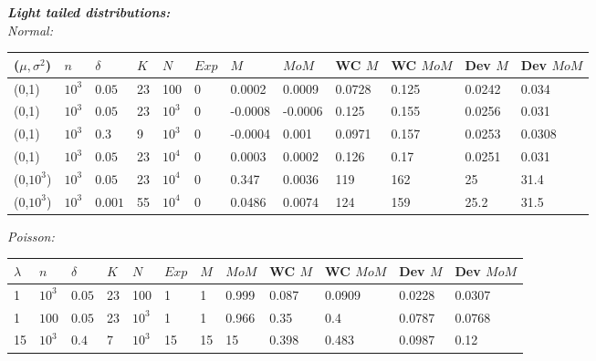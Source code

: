 \documentclass[11pt, english]{article}
\begin{document}
\textbf{\textit{Light tailed distributions:}}\\

\textit{Normal:}

\begin{center}
	
	\begin{tabular}{|l|l|l|l|l|l||l|l|l|l|l|l|}
		\hline
		($\mu,\sigma^2$) & $n$ & $\delta$ & $K$ & $N$ & $Exp$ & $M$ & $MoM$ & WC $M$ & WC $MoM$ & Dev $M$ & Dev $MoM$ \\
		\hline\hline
		(0,1) & $10^3$ &  $0.05$ & 23 & 100 & 0 & 0.0002 & 0.0009 & 0.0728 & 0.125 & 0.0242 & 0.034\\
		\hline
		(0,1) & $10^3$ &  $0.05$ & 23 & $10^3$ & 0 & -0.0008 & -0.0006 & 0.125 & 0.155 & 0.0256 & 0.031\\
		\hline
		(0,1) & $10^3$ &  $0.3$ & 9 & $10^3$ & 0 & -0.0004 & 0.001 & 0.0971 & 0.157 & 0.0253 & 0.0308\\
		\hline
		(0,1) & $10^3$ &  $0.05$ & 23 & $10^4$ & 0 & 0.0003 & 0.0002 & 0.126 & 0.17 & 0.0251 & 0.031\\
		\hline
		(0,$10^3$) & $10^3$ &  $0.05$ & 23 & $10^4$ & 0 & 0.347 & 0.0036 & 119 & 162
		& 25 & 31.4\\
		\hline
		(0,$10^3$) & $10^3$ &  $0.001$ & 55 & $10^4$ & 0 & 0.0486 & 0.0074 & 124 & 159
		& 25.2 & 31.5\\
		\hline
	\end{tabular}
	
\end{center}


\textit{Poisson:}

\begin{center}
	
	\begin{tabular}{|l|l|l|l|l|l||l|l|l|l|l|l|}
		\hline
		$\lambda$ & $n$ & $\delta$ & $K$ & $N$ & $Exp$ & $M$ & $MoM$ & WC $M$ & WC $MoM$ & Dev $M$ & Dev $MoM$ \\
		\hline\hline
		1 & $10^3$ &  $0.05$ & 23 & 100 & 1 & 1 & 0.999 & 0.087 & 0.0909 & 0.0228 & 0.0307\\
		\hline
		1 & $100$ &  $0.05$ & 23 & $10^3$ & 1 & 1 & 0.966 & 0.35 & 0.4 & 0.0787 & 0.0768\\
		\hline
		15 & $10^3$ &  $0.4$ & 7 & $10^3$ & 15 & 15 & 15 & 0.398 & 0.483 & 0.0987 & 0.12 \\
		\hline
	\end{tabular}
	
\end{center}
\end{document}
